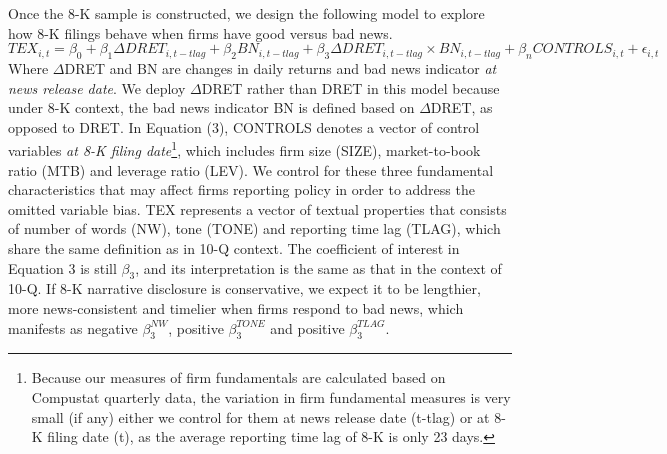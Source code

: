 \documentclass[a4paper]{article}
\begin{document}
\begin{spacing}{2}
Once the 8-K sample is constructed, we design the following model to explore how 8-K filings behave when firms have good versus bad news.
\begin{equation} \label{eq3}
TEX_{i,t}=\beta_0+\beta_1\Delta DRET_{i,t-tlag}+\beta_2BN_{i,t-tlag}+\beta_3\Delta DRET_{i,t-tlag}\times BN_{i,t-tlag}+\beta_nCONTROLS_{i,t}+\epsilon_{i,t}
\end{equation}
Where $\Delta$DRET and BN are changes in daily returns and bad news indicator \textit{at news release date}. We deploy $\Delta$DRET rather than DRET in this model because under 8-K context, the bad news indicator BN is defined based on $\Delta$DRET, as opposed to DRET. In Equation (3), CONTROLS denotes a vector of control variables \textit{at 8-K filing date}\footnote{Because our measures of firm fundamentals are calculated based on Compustat quarterly data, the variation in firm fundamental measures is very small (if any) either we control for them at news release date (t-tlag) or at 8-K filing date (t), as the average reporting time lag of 8-K is only 23 days.}, which includes firm size (SIZE), market-to-book ratio (MTB) and leverage ratio (LEV). We control for these three fundamental characteristics that may affect firms reporting policy in order to address the omitted variable bias. TEX represents a vector of textual properties that consists of number of words (NW), tone (TONE) and reporting time lag (TLAG), which share the same definition as in 10-Q context. The coefficient of interest in Equation 3 is still $\beta_3$, and its interpretation is the same as that in the context of 10-Q. If 8-K narrative disclosure is conservative, we expect it to be lengthier, more news-consistent and timelier when firms respond to bad news, which manifests as negative $\beta_3^{NW}$, positive  $\beta_3^{TONE}$ and positive $\beta_3^{TLAG}$.


\end{spacing}
\end{document}
